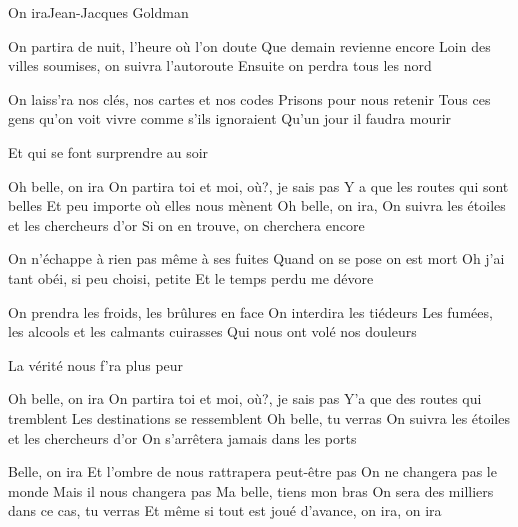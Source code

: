 \documentclass[a4paper,11pt,french]{article}
\begin{document}
\begin{Song}{On ira}{Jean-Jacques Goldman}

\begin{multicols}{2}
\begin{Verse}
On partira de nuit, l'heure o\`{u} l'on doute
Que demain revienne encore
Loin des villes soumises, on suivra l'autoroute
Ensuite on perdra tous les nord
\espaceInterStrophe

On laiss'ra nos cl\'{e}s, nos cartes et nos codes
Prisons pour nous retenir
Tous ces gens qu'on voit vivre comme s'ils ignoraient
Qu'un jour il faudra mourir 
\end{Verse}
\espaceInterStrophe

\begin{Bridge}
Et qui se font surprendre au soir
\end{Bridge}
\espaceInterStrophe

\begin{Chorus}
Oh belle, on ira
On partira toi et moi, o\`{u}?, je sais pas
Y a que les routes qui sont belles
Et peu importe o\`{u} elles nous m\`{e}nent
Oh belle, on ira,
On suivra les \'{e}toiles et les chercheurs d'or
Si on en trouve, on cherchera encore
\end{Chorus}
\vfill
\columnbreak

\begin{Verse}
On n'\'{e}chappe \`{a} rien pas m\^{e}me \`{a} ses fuites
Quand on se pose on est mort
Oh j'ai tant ob\'{e}i, si peu choisi, petite
Et le temps perdu me d\'{e}vore
\espaceInterStrophe

On prendra les froids, les br\^{u}lures en face
On interdira les ti\'{e}deurs
Les fum\'{e}es, les alcools et les calmants cuirasses
Qui nous ont vol\'{e} nos douleurs
\end{Verse}
\espaceInterStrophe

\begin{Bridge}
La v\'{e}rit\'{e} nous f'ra plus peur
\end{Bridge}
\espaceInterStrophe

\begin{Chorus}
Oh belle, on ira
On partira toi et moi, o\`{u}?, je sais pas
Y'a que des routes qui tremblent
Les destinations se ressemblent
Oh belle, tu verras
On suivra les \'{e}toiles et les chercheurs d'or
On s'arr\^{e}tera jamais dans les ports
\end{Chorus}
\espaceInterStrophe

\begin{Chorus}
Belle, on ira
Et l'ombre de nous rattrapera peut-\^{e}tre pas
On ne changera pas le monde
Mais il nous changera pas
Ma belle, tiens mon bras
On sera des milliers dans ce cas, tu verras
Et m\^{e}me si tout est jou\'{e} d'avance, on ira, on ira
\end{Chorus}
\end{multicols}
\vfill
\begin{multicols}{2}


\end{multicols}
\end{Song}
\end{document}
